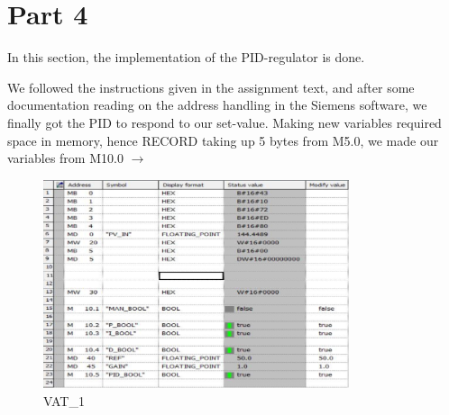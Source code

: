 \newpage
\section{Part 4}
In this section, the implementation of the PID-regulator is done.

We followed the instructions given in the assignment text, and after some documentation reading on the address handling in the Siemens software, we finally got the PID to respond to our set-value. Making new variables required space in memory, hence RECORD taking up 5 bytes from M5.0, we made our variables from M10.0 $\rightarrow$

\begin{figure}[!htb]
    \centering
    \includegraphics[width=0.8\textwidth]{images/bilde4}
    \caption{VAT\_1}
\end{figure}

